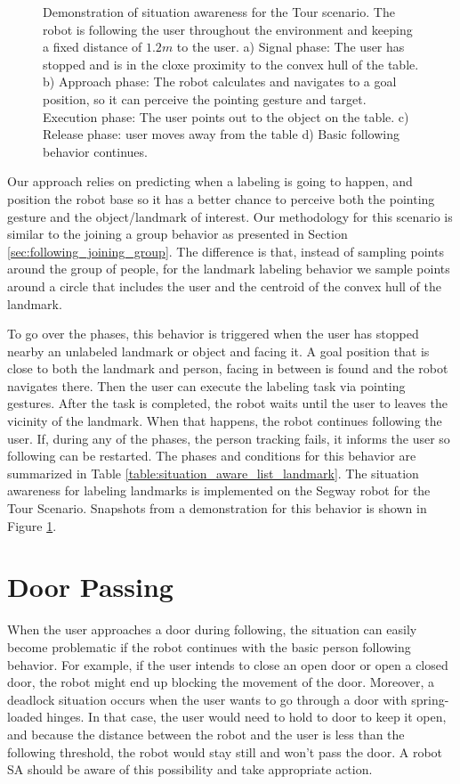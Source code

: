 \begin{figure}[ht!]
{        }
    \caption{Demonstration of situation awareness for the Tour scenario. The robot is following the user throughout the environment and keeping a fixed distance of $1.2m$ to the user. a) Signal phase: The user has stopped and is in the cloxe proximity to the convex hull of the table. b) Approach phase: The robot calculates and navigates to a goal position, so it can perceive the pointing gesture and target. Execution phase: The user points out to the object on the table. c) Release phase: user moves away from the table d) Basic following behavior continues.}
   \label{fig:situtation_aware_landmark_labeling}
\end{figure}

Our approach relies on predicting when a labeling is going to happen, and position the robot base so it has a better chance to perceive both the pointing gesture and the object/landmark of interest. Our methodology for this scenario is similar to the joining a group behavior as presented in Section \ref{sec:following_joining_group}. The difference is that, instead of sampling points around the group of people, for the landmark labeling behavior we sample points around a circle that includes the user and the centroid of the convex hull of the landmark.

To go over the phases, this behavior is triggered when the user has stopped nearby an unlabeled landmark or object and facing it. A goal position that is close to both the landmark and person, facing in between is found and the robot navigates there. Then the user can execute the labeling task via pointing gestures. After the task is completed, the robot waits until the user to leaves the vicinity of the landmark. When that happens, the robot continues following the user. If, during any of the phases, the person tracking fails, it informs the user so following can be restarted. The phases and conditions for this behavior are summarized in Table \ref{table:situation_aware_list_landmark}. The situation awareness for labeling landmarks is implemented on the Segway robot for the Tour Scenario. Snapshots from a demonstration for this behavior is shown in Figure \ref{fig:situtation_aware_landmark_labeling}.

\section{Door Passing}
\label{sec:following_door_passing}

When the user approaches a door during following, the situation can easily become problematic if the robot continues with the basic person following behavior. For example, if the user intends to close an open door or open a closed door, the robot might end up blocking the movement of the door. Moreover, a deadlock situation occurs when the user wants to go through a door with spring-loaded hinges. In that case, the user would need to hold to door to keep it open, and because the distance between the robot and the user is less than the following threshold, the robot would stay still and won't pass the door. A robot SA should be aware of this possibility and take appropriate action. 

